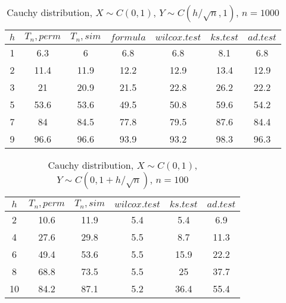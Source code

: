 \documentclass{svproc}
\begin{document}
\begin{table}
  \caption{Cauchy distribution, $X\sim C(0,1)$, $Y\sim C(h/\sqrt{n},1)$, $n=1000$}
  \begin{center}
  \begin{tabular}{c@{\quad}c@{\quad}c@{\quad}c@{\quad}c@{\quad}c@{\quad}c}
  \hline
  $h$  & $T_n, perm$ & $T_n, sim$ & $formula$ & $wilcox.test$ & $ks.test$ & $ad.test$ \\
  \hline
  1 & 6.3 & 6 & 6.8 & 6.8 & 8.1 & 6.8\\
  2 & 11.4 & 11.9 & 12.2 & 12.9 & 13.4 & 12.9 \\
  3 & 21 & 20.9 & 21.5 & 22.8 & 26.2 & 22.2 \\
  5 & 53.6 & 53.6 & 49.5 & 50.8 & 59.6 & 54.2 \\
  7 & 84 & 84.5 & 77.8 & 79.5 & 87.6 & 84.4 \\
  9 & 96.6 & 96.6 & 93.9 & 93.2 & 98.3 & 96.3 \\
  \hline
  \end{tabular}
  \end{center}
\end{table}

\begin{table}
  \caption{Cauchy distribution, $X\sim C(0,1)$, $Y\sim C(0, 1 + h/\sqrt{n})$, $n=100$}
  \begin{center}
  \begin{tabular}{c@{\quad}c@{\quad}c@{\quad}c@{\quad}c@{\quad}c}
  \hline
  $h$ & $T_n, perm$ & $T_n, sim$ & $wilcox.test$ & $ks.test$ & $ad.test$ \\
  \hline
  2 & 10.6 & 11.9 & 5.4 & 5.4 & 6.9 \\
  4 & 27.6 & 29.8 & 5.5 & 8.7 & 11.3 \\
  6 & 49.4 & 53.6 & 5.5 & 15.9 & 22.2 \\
  8 & 68.8 & 73.5 & 5.5 & 25 & 37.7 \\
  10 & 84.2 & 87.1 & 5.2 & 36.4 & 55.4 \\
  \hline
  \end{tabular}
  \end{center}
\end{table}
\end{document}
